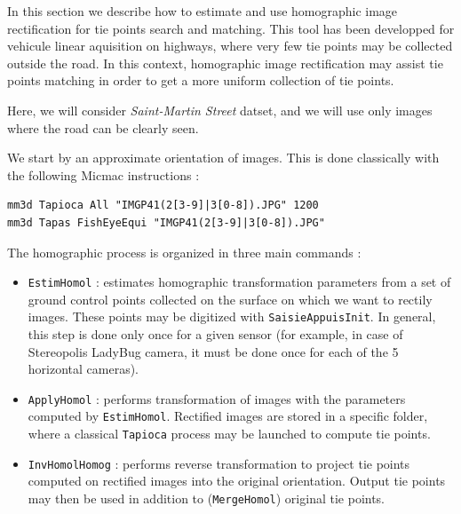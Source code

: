 \noindent In this section we describe how to estimate and use homographic image rectification for tie points search and matching. This tool has been developped for vehicule linear aquisition on highways, where very few tie points may be collected outside the road. In this context, homographic image rectification may assist tie points matching in order to get a more uniform collection of tie points. \newline

\noindent Here, we will consider \textit{Saint-Martin Street} datset, and we will use only images where the road can be clearly seen. \newline

\noindent We start by an approximate orientation of images. This is done classically with the following Micmac instructions : \newline

\begin{verbatim}
mm3d Tapioca All "IMGP41(2[3-9]|3[0-8]).JPG" 1200
mm3d Tapas FishEyeEqui "IMGP41(2[3-9]|3[0-8]).JPG"
\end{verbatim}

\noindent The homographic process is organized in three main commands : \newline
\begin{itemize}
	\item \texttt{EstimHomol} : estimates homographic transformation parameters from a set of ground control points collected on the surface on which we want to rectily images. These points may be digitized with \texttt{SaisieAppuisInit}. In general, this step is done only once for a given sensor (for example, in case of Stereopolis LadyBug camera, it must be done once for each of the 5 horizontal cameras).  \newline 	
	\item \texttt{ApplyHomol} : performs transformation of images with the parameters computed by \texttt{EstimHomol}. Rectified images are stored in a specific folder, where a classical \texttt{Tapioca} process may be launched to compute tie points.   \newline 
	\item \texttt{InvHomolHomog} : performs reverse transformation to project tie points computed on rectified images into the original orientation. Output tie points may then be used in addition to (\texttt{MergeHomol}) original tie points.   \newline 
\end{itemize}

